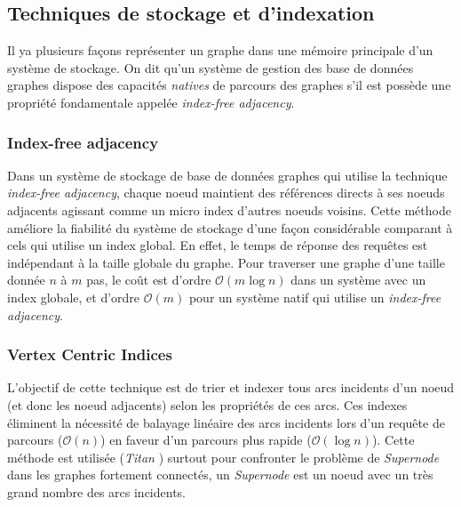   \subsection{Techniques de stockage et d'indexation}
  \label{sec:graph-internals}
  Il ya plusieurs façons représenter un graphe dans une mémoire
  principale d'un système de stockage. On dit qu'un système de gestion
  des base de données graphes dispose des capacités \emph{natives} de
  parcours des graphes s'il est possède une propriété fondamentale
  appelée \emph{index-free adjacency}.

  
  \newpage

    \subsubsection{Index-free adjacency}
    \label{sec:index-free}
    Dans un système de stockage de base de données graphes qui utilise
    la technique \emph{index-free adjacency}, chaque noeud maintient
    des références directs à ses noeuds adjacents agissant comme un
    micro index d'autres noeuds voisins. Cette méthode améliore la
    fiabilité du système de stockage d'une façon considérable
    comparant à cels qui utilise un index global. En effet, le temps
    de réponse des requêtes est indépendant à la taille globale du
    graphe. Pour traverser une graphe d'une taille donnée $n$ à $m$
    pas, le coût est d'ordre $\mathcal{O}(m\log{}n)$ dans un système
    avec un index globale, et d'ordre $\mathcal{O}(m)$ pour un système
    natif qui utilise un \emph{index-free adjacency}.

    

    \subsubsection{Vertex Centric Indices}
    \label{sec:vertex}

    L'objectif de cette technique est de trier et indexer tous arcs
    incidents d'un noeud (et donc les noeud adjacents) selon les
    propriétés de ces arcs. Ces indexes éliminent la nécessité de
    balayage linéaire des arcs incidents lors d'un requête de parcours
    ($\mathcal{O}(n)$) en faveur d'un parcours plus rapide
    ($\mathcal{O}(\log{}n)$). Cette méthode est utilisée (\emph{Titan}
    \cite{vertexci}) surtout pour confronter le problème de
    \emph{Supernode} dans les graphes fortement connectés, un
    \emph{Supernode} est un noeud avec un très grand nombre des arcs
    incidents.

